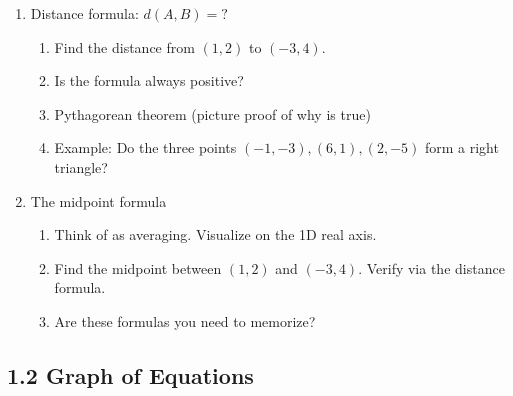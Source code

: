 \documentclass{article}
\begin{document}
\begin{enumerate}
\item Distance formula: $d(A,B)=?$
\begin{enumerate}
\item Find the distance from $(1,2)$ to $(-3,4)$. 
\item Is the formula always positive?
\item Pythagorean theorem (picture proof of why is true)
\item Example: Do the three points $(-1,-3), (6, 1), (2,-5)$ form a right triangle?
\end{enumerate}

\item The midpoint formula
\begin{enumerate}
\item Think of as averaging. Visualize on the 1D real axis.
\item Find the midpoint between $(1,2)$ and $(-3,4)$. Verify via the distance formula.
\item Are these formulas you need to memorize?
\end{enumerate}

\end{enumerate}



\subsection{1.2 Graph of Equations}
\end{document}
